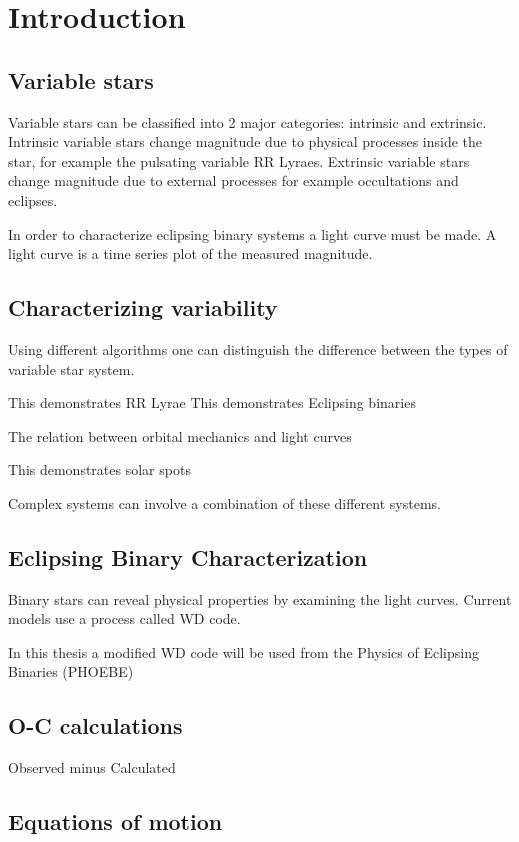 \chapter{Introduction}\label{ch:intro}

\section{Variable stars}
Variable stars can be classified into 2 major categories: intrinsic and extrinsic.
Intrinsic variable stars change magnitude due to physical processes inside the star, for example the pulsating variable RR Lyraes.
Extrinsic variable stars change magnitude due to external processes for example occultations and eclipses.

In order to characterize eclipsing binary systems a light curve must be made.
A light curve is a time series plot of the measured magnitude.

\section{Characterizing variability}
Using different algorithms one can distinguish the difference between the types of variable star system.

This demonstrates RR Lyrae
This demonstrates Eclipsing binaries

The relation between orbital mechanics and light curves

This demonstrates solar spots

Complex systems can involve a combination of these different systems.

\section{Eclipsing Binary Characterization}
Binary stars can reveal physical properties by examining the light curves.
Current models use a process called WD code.

In this thesis a modified WD code will be used from the Physics of Eclipsing Binaries (PHOEBE)

\section{O-C calculations}
Observed minus Calculated

\section{Equations of motion}

